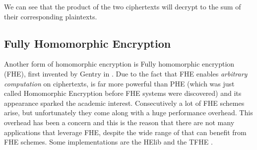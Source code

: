 We can see that the product of the two ciphertexts will decrypt to the sum of their corresponding plaintexts.

\subsection{Fully Homomorphic Encryption}\label{ss:fhe}
Another form of homomorphic encryption is Fully homomorphic encryption (FHE), first invented by Gentry in \cite{gentry2009fully}.
Due to the fact that FHE enables \textit{arbitrary computation} on ciphertexts, is far more powerful than PHE (which was just called Homomorphic Encryption before FHE systems were discovered) and its appearance sparked the academic interest.
Consecutively a lot of FHE schemes arise, but unfortunately they come along with a huge performance overhead.
This overhead has been a concern and this is the reason that there are not many applications that leverage FHE, despite the wide range of that can benefit from FHE schemes.
Some implementations are the HElib \cite{halevi2014algorithms} and the TFHE \cite{chillotti2016faster}.


